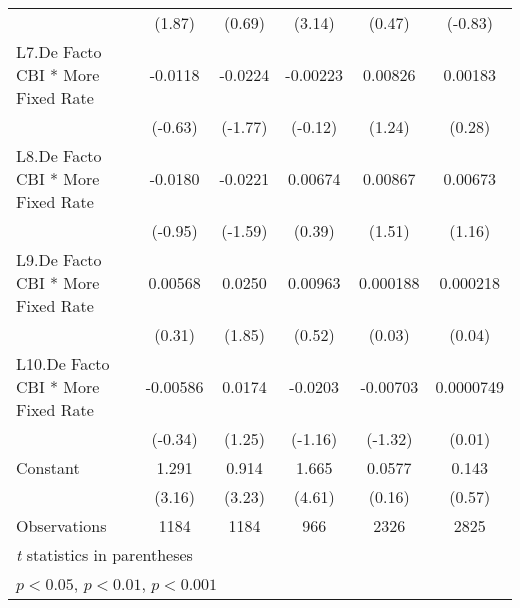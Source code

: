 {\begin{longtable}{l*{5}{c}}
                &   (1.87)         &   (0.69)         &   (3.14)         &   (0.47)         &  (-0.83)         \\
[1em]
L7.De Facto CBI * More Fixed Rate&  -0.0118         &  -0.0224         & -0.00223         &  0.00826         &  0.00183         \\
                &  (-0.63)         &  (-1.77)         &  (-0.12)         &   (1.24)         &   (0.28)         \\
[1em]
L8.De Facto CBI * More Fixed Rate&  -0.0180         &  -0.0221         &  0.00674         &  0.00867         &  0.00673         \\
                &  (-0.95)         &  (-1.59)         &   (0.39)         &   (1.51)         &   (1.16)         \\
[1em]
L9.De Facto CBI * More Fixed Rate&  0.00568         &   0.0250         &  0.00963         & 0.000188         & 0.000218         \\
                &   (0.31)         &   (1.85)         &   (0.52)         &   (0.03)         &   (0.04)         \\
[1em]
L10.De Facto CBI * More Fixed Rate& -0.00586         &   0.0174         &  -0.0203         & -0.00703         &0.0000749         \\
                &  (-0.34)         &   (1.25)         &  (-1.16)         &  (-1.32)         &   (0.01)         \\
[1em]
Constant        &    1.291\sym{**} &    0.914\sym{**} &    1.665\sym{***}&   0.0577         &    0.143         \\
                &   (3.16)         &   (3.23)         &   (4.61)         &   (0.16)         &   (0.57)         \\
\hline
Observations    &     1184         &     1184         &      966         &     2326         &     2825         \\
\hline\hline
\multicolumn{6}{l}{\footnotesize \textit{t} statistics in parentheses}\\
\multicolumn{6}{l}{\footnotesize \sym{*} \(p<0.05\), \sym{**} \(p<0.01\), \sym{***} \(p<0.001\)}\\
\end{longtable}
}
